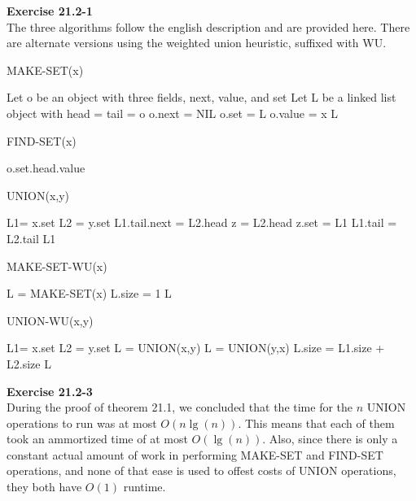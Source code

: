\documentclass{article}
\begin{document}
\noindent\textbf{Exercise 21.2-1}\\
The three algorithms follow the english description and are provided here. There are alternate versions using the weighted union heuristic, suffixed with WU.
\begin{algorithm}
\caption{MAKE-SET(x)}
\begin{algorithmic}
\State Let o be an object with three fields, next, value, and set
\State Let L be a linked list object with head = tail = o
\State o.next = NIL
\State o.set = L
\State o.value = x
\State \Return L
\end{algorithmic}
\end{algorithm}
\begin{algorithm}
\caption{FIND-SET(x)}
\begin{algorithmic}
\State \Return o.set.head.value
\end{algorithmic}
\end{algorithm}
\begin{algorithm}
\caption{UNION(x,y)}
\begin{algorithmic}
\State L1= x.set
\State L2 = y.set
\State L1.tail.next = L2.head
\State z = L2.head
\State z.set = L1
\EndWhile
\State L1.tail = L2.tail
\State \Return L1
\end{algorithmic}
\end{algorithm}
\begin{algorithm}
\caption{MAKE-SET-WU(x)}
\begin{algorithmic}
\State L = MAKE-SET(x)
\State L.size = 1
\State \Return L
\end{algorithmic}
\end{algorithm}
\begin{algorithm}
\caption{UNION-WU(x,y)}
\begin{algorithmic}
\State L1= x.set
\State L2 = y.set
\State L =  UNION(x,y)
\Else
\State L =  UNION(y,x)
\EndIf
\State L.size = L1.size + L2.size
\State \Return L
\end{algorithmic}
\end{algorithm}

\noindent\textbf{Exercise 21.2-3}\\
During the proof of theorem 21.1, we concluded that the time for the $n$ UNION operations to run was at most $O(n\lg(n))$. This means that each of them took an ammortized time of at most $O(\lg(n))$. Also, since there is only a constant actual amount of work in performing MAKE-SET and FIND-SET operations, and none of that ease is used to offest costs of UNION operations, they both have $O(1)$ runtime.\\
\end{document}
